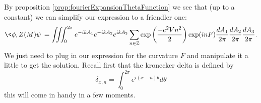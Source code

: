 \documentclass{amsart}
\numberwithin{equation}{section}
\begin{document}
By proposition \eqref{prop:fourierExpansionThetaFunction} we see
that (up to a constant) we can simplify our expression to a
friendler one:
\begin{equation}%
\<\phi,Z(M)\psi\> = \iiint^{2\pi}_{0}e^{-ikA_{1}}e^{-ikA_{2}}e^{ikA_{3}}\sum_{n\in\mathbb{Z}}\exp\left(\frac{-e^{2}Vn^{2}}{2}\right)\exp(inF)\frac{dA_{1}}{2\pi}\frac{dA_{2}}{2\pi}\frac{dA_{3}}{2\pi}.
\end{equation}
We just need to plug in our expression for the curvature $F$ and
manipulate it a little to get the solution. Recall first that the
kronecker delta is defined by
\begin{equation}%
\delta_{x,n} = \int^{2\pi}_{0} e^{i(x-n)\theta}d\theta
\end{equation}
this will come in handy in a few moments.
\end{document}
